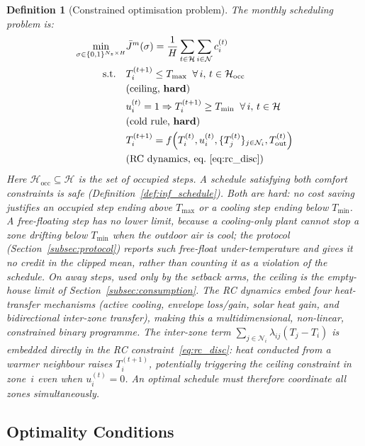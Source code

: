 \documentclass[pdflatex,sn-mathphys-num,iicol]{sn-jnl}
\theoremstyle{thmstyleone}\newtheorem{proposition}{Proposition}\newtheorem{corollary}{Corollary}
\theoremstyle{thmstyletwo}\newtheorem{remark}{Remark}\newtheorem{observation}{Observation}
\theoremstyle{thmstylethree}\newtheorem{definition}{Definition}
\newcommand{\sched}{\sigma}
\newcommand{\Tmin}{T_{\min}}
\newcommand{\Tmax}{T_{\max}}
\newcommand{\Tout}{T_{\mathrm{out}}}
\newcommand{\lij}{\lambda_{ij}}
\newcommand{\Jbar}{\bar{J}}
\begin{document}
\begin{definition}[Constrained optimisation problem]
\label{def:cop}
The monthly scheduling problem is:
\begin{equation}
\begin{aligned}
  \underset{\sched\in\{0,1\}^{N_z\times H}}{\min}
  &\Jbar^m(\sched)=\frac{1}{H}
   \sum_{t\in\mathcal{H}}\sum_{i\in\mathcal{N}} c_i^{(t)}\\
  \text{s.t.}\quad
  &T_i^{(t+1)} \le \Tmax
   \;\;\forall\,i,\,t\in\mathcal{H}_{\mathrm{occ}}\\
  &\text{(ceiling, \textbf{hard})}\\
  &u_i^{(t)}=1\Rightarrow T_i^{(t+1)}\ge\Tmin
   \;\;\forall\,i,\,t\in\mathcal{H}\\
  &\text{(cold rule, \textbf{hard})}\\
  &T_i^{(t+1)}=f\!\left(T_i^{(t)},u_i^{(t)},
    \{T_j^{(t)}\}_{j\in\mathcal{N}_i},\Tout^{(t)}\right)\\
  &\text{(RC dynamics, eq.~\eqref{eq:rc_disc})}
\end{aligned}
\label{eq:cop}
\end{equation}
Here $\mathcal{H}_{\mathrm{occ}}\subseteq\mathcal{H}$ is the set of occupied steps. A schedule satisfying both comfort constraints is \emph{safe} (Definition~\ref{def:inf_schedule}). Both are \emph{hard}: no cost saving justifies an occupied step ending above $\Tmax$ or a cooling step ending below $\Tmin$. A free-floating step has no lower limit, because a cooling-only plant cannot stop a zone drifting below $\Tmin$ when the outdoor air is cool; the protocol (Section~\ref{subsec:protocol}) reports such free-float under-temperature and gives it no credit in the clipped mean, rather than counting it as a violation of the schedule. On away steps, used only by the setback arms, the ceiling is the empty-house limit of Section~\ref{subsec:consumption}. The RC dynamics embed four heat-transfer mechanisms (active cooling, envelope loss/gain, solar heat gain, and bidirectional inter-zone transfer), making this a multidimensional, non-linear, constrained binary programme. The inter-zone term $\sum_{j\in\mathcal{N}_i}\lij(T_j-T_i)$ is embedded directly in the RC constraint~\eqref{eq:rc_disc}: heat conducted from a warmer neighbour raises $T_i^{(t+1)}$, potentially triggering the ceiling constraint in zone~$i$ even when $u_i^{(t)}=0$. An optimal schedule must therefore coordinate all zones simultaneously.
\end{definition}
 
\subsection{Optimality Conditions}
\label{subsec:optcond}
 
\end{document}
